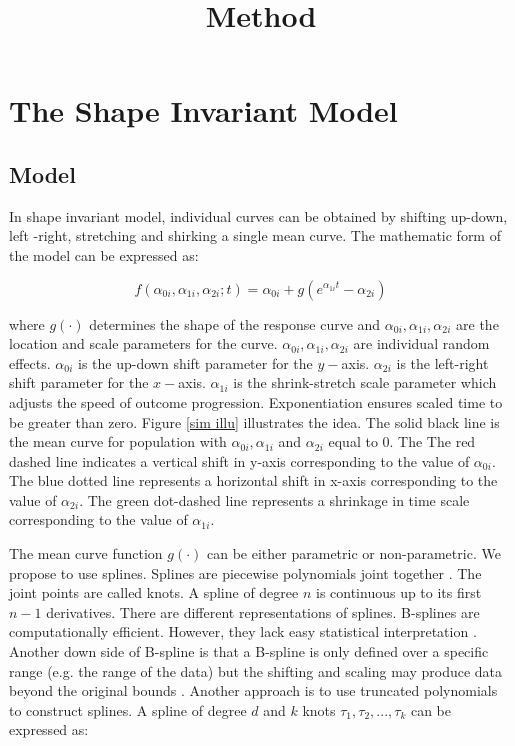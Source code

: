 \documentclass{article}
\title{Method}
\numberwithin{equation}{section}
\begin{document}
\maketitle


\newpage

\section{The Shape Invariant Model}

 \subsection{Model}
 
In shape invariant model, individual curves can be obtained by shifting up-down, left -right, stretching and shirking a single mean curve. The mathematic form of the model can be expressed as:


\begin{equation}\label{meth:sim1}
f(\alpha_{0i},\alpha_{1i},\alpha_{2i};t)=\alpha_{0i}+g(e^{\alpha_{1i}t}-\alpha_{2i})
\end{equation}

where $g(\cdot)$ determines the shape of the response curve and $\alpha_{0i},\alpha_{1i},\alpha_{2i}$ are the location and scale parameters for the curve. $\alpha_{0i},\alpha_{1i},\alpha_{2i}$ are individual random effects. $\alpha_{0i}$ is the up-down shift parameter for the $y-$axis. $\alpha_{2i}$ is the left-right shift parameter for the $x-$axis. $\alpha_{1i}$ is the shrink-stretch scale parameter which adjusts the speed of outcome progression. Exponentiation ensures scaled time to be greater
than zero. Figure \ref{sim illu} illustrates the idea. The solid black line is the mean curve for population with $\alpha_{0i},\alpha_{1i}$ and $\alpha_{2i}$ equal to $0$. The 
The red dashed line indicates a vertical shift in y-axis corresponding to the value of  $\alpha_{0i}$. The blue dotted line represents a horizontal shift in x-axis corresponding to the value of $\alpha_{2i}$. The green dot-dashed line represents a shrinkage in time scale corresponding to the value of $\alpha_{1i}$.

The mean curve function $g(\cdot)$ can be either parametric or non-parametric. We propose 
to use splines. Splines are piecewise polynomials joint together \cite{smith1979splines}. The joint points are called knots. A spline of degree $n$ is continuous up to its first $n-1$ derivatives. There are different representations of splines. B-splines are computationally efficient. However, they lack easy statistical interpretation \cite{smith1979splines}. Another down side of B-spline is that a B-spline is only defined over a specific range (e.g. the range of the data) but the shifting and scaling may produce data beyond the original bounds \cite{beath2007infant}.  Another approach is to use truncated polynomials to construct splines. A spline of degree $d$ and $k$ knots $\tau_1,\tau_2,...,\tau_k$ can be expressed as:
\end{document}
